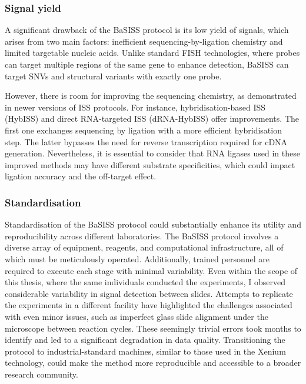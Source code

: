 \subsubsection*{Signal yield}

A significant drawback of the \ac{BaSISS} protocol is its low yield of signals, which arises from two main factors: inefficient sequencing-by-ligation chemistry and limited targetable nucleic acids. Unlike standard FISH technologies, where probes can target multiple regions of the same gene to enhance detection, \ac{BaSISS} can target \acp{SNV} and structural variants with exactly one probe.

However, there is room for improving the sequencing chemistry, as demonstrated in newer versions of \ac{ISS} protocols. For instance, hybridisation-based \ac{ISS} (HybISS) \parencite{Gyllborg2020-uq} and direct RNA-targeted \ac{ISS} (dRNA-HybISS) \parencite{Lee2022-ha} offer improvements. The first one exchanges sequencing by ligation with a more efficient hybridisation step. The latter bypasses the need for reverse transcription required for cDNA generation. Nevertheless, it is essential to consider that RNA ligases used in these improved methods may have different substrate specificities, which could impact ligation accuracy and the off-target effect.

\subsubsection*{Standardisation}

Standardisation of the \ac{BaSISS} protocol could substantially enhance its utility and reproducibility across different laboratories. The \ac{BaSISS} protocol involves a diverse array of equipment, reagents, and computational infrastructure, all of which must be meticulously operated. Additionally, trained personnel are required to execute each stage with minimal variability. Even within the scope of this thesis, where the same individuals conducted the experiments, I observed considerable variability in signal detection between slides. Attempts to replicate the experiments in a different facility have highlighted the challenges associated with even minor issues, such as imperfect glass slide alignment under the microscope between reaction cycles. These seemingly trivial errors took months to identify and led to a significant degradation in data quality. Transitioning the protocol to industrial-standard machines, similar to those used in the \ac{Xenium} technology, could make the method more reproducible and accessible to a broader research community.

